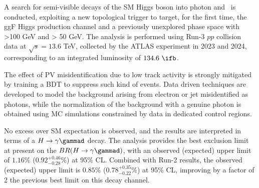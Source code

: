 A search for semi-visible decays of the SM Higgs boson into photon and \ETmiss\ is conducted, exploiting a new topological trigger to target, for the first time, the ggF Higgs production channel and a previously unexplored phase space with \ETmiss>100 GeV and \pTy > 50 GeV. The analysis is performed using Run-3 $pp$ collision data at $\sqrt{s}=13.6$ TeV, collected by the ATLAS experiment in 2023 and 2024, corresponding to an integrated luminosity of $134.6~\ifb$. 

The effect of PV misidentification due to low track activity is strongly mitigated by training a BDT to suppress such kind of events. Data driven techniques are developed to model the background arising from electron or jet misidentified as photons, while the normalization of the background with a genuine photon is obtained using MC simulations constrained by data in dedicated control regions.  

No excess over SM expectation is observed, and the results are interpreted in terms of a $H\to\gamma\gammad$ decay. The analysis provides the best exclusion limit at present on the $BR(H\to\gamma\gammad)$, with an observed (expected) upper limit  of $1.16\%$ ($0.92^{+0.46}_{-0.28}\%$) at 95\% CL. Combined with Run-2 results, the observed (expected) upper limit is $0.85\%$ ($0.78^{+0.35}_{-0.22}\%$) at 95\% CL, improving by a factor of 2 the previous best limit on this decay channel.
